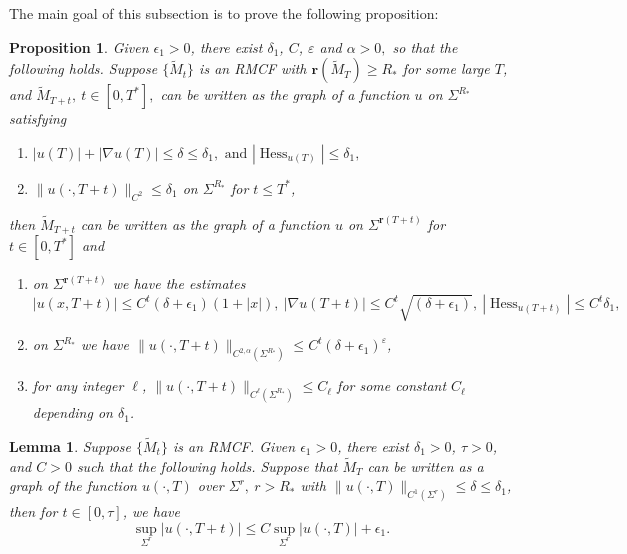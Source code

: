 \documentclass[12pt]{amsart}
\numberwithin{equation}{section}
\newtheorem{proposition}[theorem]{Proposition}
\newtheorem{lemma}[theorem]{Lemma}
\numberwithin{equation}{section}
\newcommand{\eps}{\varepsilon}
\newcommand{\dt}{\delta}
\DeclareMathOperator{\Hess}{Hess}
\begin{document}
	The main goal of this subsection is to prove the following proposition:
	
	\begin{proposition}\label{propHolder}
		Given $\epsilon_1>0$, there exist $\delta_1$, $C$, $\eps$ and $\alpha>0,$ so that the following holds. Suppose $\{\widetilde M_t\}$ is an RMCF with $\mathbf{r}(\widetilde M_T)\geq R_*$ for some large $T$, and $\widetilde M_{T+t},\ t\in [0,T^*],$ can be written as the graph of a function $u$ on $\Sigma^{R_*}$ satisfying
		\begin{enumerate}
			\item	$|u(T)|+|\nabla u(T)|\leq \delta\leq \delta_1, \text{ and } |\Hess_{u(T)}|\leq \delta_1,$	
			\item $\|u(\cdot,T+t)\|_{C^{2}}\leq \delta_1$ on $\Sigma^{R_*}$ for $t\leq T^*$, 
		\end{enumerate}
		then $\widetilde M_{T+t}$ can be written as the graph of a function $u$ on $\Sigma^{\mathbf{r}({T+t})}$ for $t\in[0,T^*]$ and
		\begin{enumerate}
			\item  on $\Sigma^{\mathbf{r}( {T+t})}$ we have the estimates $$|u(x,T+t)|\leq C^t (\delta+\epsilon_1)(1+|x|),\ |\nabla u(T+t)|\leq C^t\sqrt{(\delta+\epsilon_1)},\ |\Hess_{u(T+t)}|\leq C^t\dt_1,$$
			\item on $\Sigma^{R_*}$ we have $\|u(\cdot,T+t)\|_{C^{2,\alpha}(\Sigma^{R_*})}\leq C^t (\delta+\epsilon_1)^\eps$,
			\item for any integer $\ell$, $\|u(\cdot,T+t)\|_{C^\ell(\Sigma^{R_*})}\leq C_\ell$ for some constant $C_\ell$ depending on $\delta_1$.
		\end{enumerate}
	\end{proposition}
	\begin{lemma}\label{Lem:C0bound}
		Suppose $\{\widetilde M_t\}$ is an RMCF. Given $\epsilon_1>0$, there exist $\delta_1>0$,  $\tau>0$, and $C>0$ such that the following holds. Suppose that $\widetilde M_T$ can be written as a graph of the function $u(\cdot,T)$ over $\Sigma^{r},\ r>R_*$ with $\|u(\cdot,T)\|_{C^1(\Sigma^{r})}\leq \delta\leq \delta_1$, then for $t\in[0,\tau]$, we have
		$$\sup_{\Sigma^{r}}|u(\cdot,T+t)|\leq C\sup_{\Sigma^{r}}|u(\cdot,T)|+\epsilon_1.$$
	\end{lemma}
	
\end{document}
